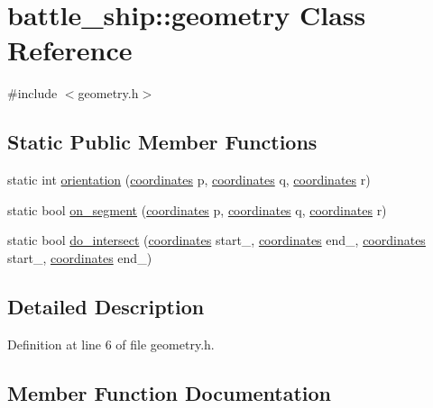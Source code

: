 \hypertarget{classbattle__ship_1_1geometry}{}\section{battle\+\_\+ship\+:\+:geometry Class Reference}
\label{classbattle__ship_1_1geometry}


{\ttfamily \#include $<$geometry.\+h$>$}

\subsection*{Static Public Member Functions}
\begin{DoxyCompactItemize}
\item 
static int \hyperlink{classbattle__ship_1_1geometry_a319941076b65116cfb1ab1f636fb9b20}{orientation} (\hyperlink{structbattle__ship_1_1coordinates}{coordinates} p, \hyperlink{structbattle__ship_1_1coordinates}{coordinates} q, \hyperlink{structbattle__ship_1_1coordinates}{coordinates} r)
\item 
static bool \hyperlink{classbattle__ship_1_1geometry_a69fccbb7267eb16930041fbdfeb1064a}{on\+\_\+segment} (\hyperlink{structbattle__ship_1_1coordinates}{coordinates} p, \hyperlink{structbattle__ship_1_1coordinates}{coordinates} q, \hyperlink{structbattle__ship_1_1coordinates}{coordinates} r)
\item 
static bool \hyperlink{classbattle__ship_1_1geometry_a5415f69950638f0c84652b40d38e7ebd}{do\+\_\+intersect} (\hyperlink{structbattle__ship_1_1coordinates}{coordinates} start\+\_, \hyperlink{structbattle__ship_1_1coordinates}{coordinates} end\+\_, \hyperlink{structbattle__ship_1_1coordinates}{coordinates} start\+\_, \hyperlink{structbattle__ship_1_1coordinates}{coordinates} end\+\_)
\end{DoxyCompactItemize}


\subsection{Detailed Description}


Definition at line 6 of file geometry.\+h.



\subsection{Member Function Documentation}
\mbox{\label{classbattle__ship_1_1geometry_a5415f69950638f0c84652b40d38e7ebd}} 
